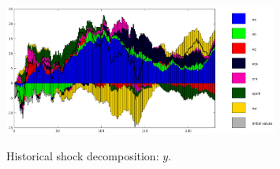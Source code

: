  
\begin{figure}[H]
\centering 
\includegraphics[width=0.8\textwidth]{Smets_Wouters_2007/graphs/Smets_Wouters_2007_shock_decomposition_y}
\label{Fig:shock_decomp:y}
\caption{Historical shock decomposition: $ y $.}
\end{figure}
 
 
